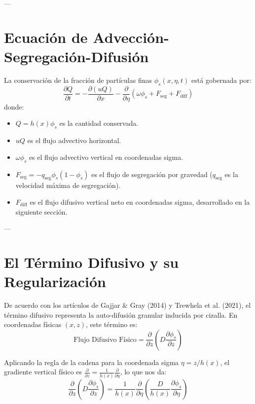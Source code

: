 \documentclass[11pt,a4paper]{article}
\begin{document}
---

\section{Ecuación de Advección-Segregación-Difusión}
La conservación de la fracción de partículas finas $\phi_s(x, \eta, t)$ está gobernada por:
\begin{equation}
\frac{\partial Q}{\partial t} = -\frac{\partial (u Q)}{\partial x} - \frac{\partial}{\partial \eta} \left( \omega \phi_s + F_{\text{seg}} + F_{\text{diff}} \right)
\end{equation}
donde:
\begin{itemize}
    \item $Q = h(x) \phi_s$ es la cantidad conservada.
    \item $u Q$ es el flujo advectivo horizontal.
    \item $\omega \phi_s$ es el flujo advectivo vertical en coordenadas sigma.
    \item $F_{\text{seg}} = - q_{\text{seg}} \phi_s (1 - \phi_s)$ es el flujo de segregación por gravedad ($q_{\text{seg}}$ es la velocidad máxima de segregación).
    \item $F_{\text{diff}}$ es el flujo difusivo vertical neto en coordenadas sigma, desarrollado en la siguiente sección.
\end{itemize}

---

\section{El Término Difusivo y su Regularización}
De acuerdo con los artículos de Gajjar \& Gray (2014) y Trewhela et al. (2021), el término difusivo representa la auto-difusión granular inducida por cizalla. En coordenadas físicas $(x, z)$, este término es:
\begin{equation}
\text{Flujo Difusivo Físico} = \frac{\partial}{\partial z} \left( D \frac{\partial \phi_s}{\partial z} \right)
\end{equation}

Aplicando la regla de la cadena para la coordenada sigma $\eta = z/h(x)$, el gradiente vertical físico es $\frac{\partial}{\partial z} = \frac{1}{h(x)} \frac{\partial}{\partial \eta}$, lo que nos da:
\begin{equation}
\frac{\partial}{\partial z} \left( D \frac{\partial \phi_s}{\partial z} \right) = \frac{1}{h(x)} \frac{\partial}{\partial \eta} \left( \frac{D}{h(x)} \frac{\partial \phi_s}{\partial \eta} \right)
\end{equation}
\end{document}
